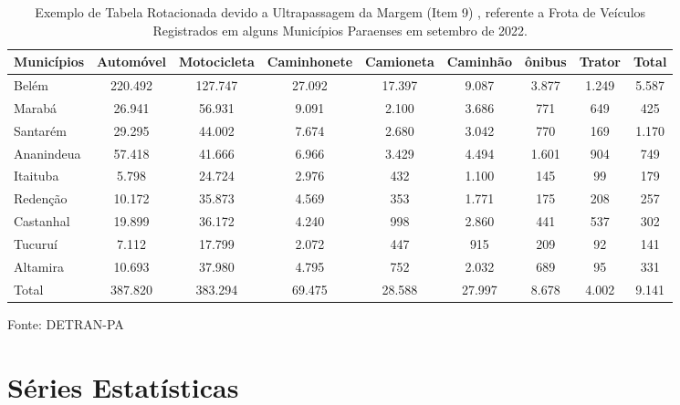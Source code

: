 \begin{table}
\centering
    {
\caption{Exemplo de Tabela Rotacionada devido a Ultrapassagem da Margem (Item 9) , referente a Frota de Veículos Registrados em alguns Municípios Paraenses em setembro de 2022.}
\label{tabelarotacionada}
    \vspace{0.2cm}
\begin{tabular}{l|c|c|c|c|c|c|c|c}
\hline
Municípios & Automóvel & Motocicleta & Caminhonete  & Camioneta & Caminhão  & ônibus & Trator & Total \\
\hline\hline
Belém      & 220.492  & 127.747      & 27.092       & 17.397    & 9.087     & 3.877  & 1.249  & 5.587 \\
Marabá     & 26.941   & 56.931       & 9.091        & 2.100  & 3.686     & 771      & 649    & 425    \\
Santarém   & 29.295   & 44.002       & 7.674        & 2.680  & 3.042     & 770      & 169    & 1.170  \\ 
Ananindeua & 57.418   & 41.666       & 6.966        & 3.429  & 4.494     & 1.601    & 904    & 749    \\  
Itaituba   & 5.798    & 24.724       & 2.976        & 432    & 1.100     & 145      & 99     & 179    \\  
Redenção   & 10.172   & 35.873       & 4.569        & 353    & 1.771     & 175      & 208    & 257    \\
Castanhal  & 19.899   & 36.172       & 4.240        & 998    & 2.860     & 441      & 537    & 302     \\
Tucuruí    & 7.112    & 17.799       & 2.072        & 447    & 915       & 209      & 92     & 141    \\
Altamira   & 10.693   & 37.980       & 4.795        & 752    & 2.032     & 689      & 95     & 331    \\
\hline
  Total    & 387.820  & 383.294      & 69.475      & 28.588 & 27.997    & 8.678    & 4.002  & 9.141   \\
\hline\hline 
\end{tabular}} 
\begin{flushleft}
Fonte: DETRAN-PA 
\end{flushleft}
\end{table}


\newpage


\section{Séries Estatísticas}

